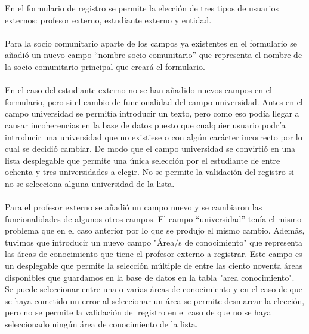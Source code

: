 \documentclass[11pt]{book}
\begin{document}
En el formulario de registro se permite la elección de tres tipos de usuarios externos: profesor externo, estudiante externo y entidad.\\\\
Para la socio comunitario aparte de los campos ya existentes en el formulario se añadió un nuevo campo “nombre socio comunitario” que representa el nombre de la socio comunitario principal que creará el formulario.\\\\
En el caso del estudiante externo no se han añadido nuevos campos en el formulario, pero si el cambio de funcionalidad del campo universidad. Antes en el campo universidad se permitía introducir un texto, pero como eso podía llegar a causar incoherencias en la base de datos puesto que cualquier usuario podría introducir una universidad que no existiese o con algún carácter incorrecto por lo cual se decidió cambiar. De modo que el campo universidad se convirtió en una lista desplegable que permite una única selección por el estudiante de entre ochenta y tres universidades a elegir.  No se permite la validación del registro si no se selecciona alguna universidad de la lista. \\\\
Para el profesor externo se añadió un campo nuevo y se cambiaron las funcionalidades de algunos otros campos. El campo “universidad” tenía el mismo problema que en el caso anterior por lo que se produjo el mismo cambio. Además, tuvimos que introducir un nuevo campo "Área/s de conocimiento" que representa las áreas de conocimiento que tiene el profesor externo a registrar. Este campo es un desplegable que permite la selección múltiple de entre las ciento noventa áreas disponibles que guardamos en la base de datos en la tabla "area conocimiento". Se puede seleccionar entre una o varias áreas de conocimiento y en el caso de que se haya cometido un error al seleccionar un área se permite desmarcar la elección, pero no se permite la validación del registro en el caso de que no se haya seleccionado ningún área de conocimiento de la lista.\\\\
\end{document}
